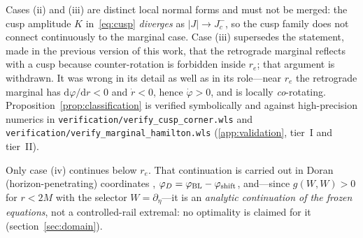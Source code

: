 \documentclass[12pt]{iopart}
\theoremstyle{plain}
\theoremstyle{definition}
\theoremstyle{remark}
\newcommand{\re}{r_{e}}
\newcommand{\Jc}{J_{c}}
\newcommand{\dd}{\mathrm{d}}
\begin{document}
Cases (ii) and (iii) are distinct local normal forms and must not be merged: the
cusp amplitude $K$ in~\eqref{eq:cusp} \emph{diverges} as $|J|\to\Jc^-$, so the
cusp family does not connect continuously to the marginal case. Case (iii)
supersedes the statement, made in the previous version of this work, that the
retrograde marginal reflects with a cusp because counter-rotation is forbidden
inside $\re$; that argument is withdrawn. It was wrong in its detail as well as
in its role---near $\re$ the retrograde marginal has $\dd\varphi/\dd r<0$ and
$\dot r<0$, hence $\dot\varphi>0$, and is locally \emph{co}-rotating.
Proposition~\ref{prop:classification} is verified symbolically and against
high-precision numerics in \texttt{verification/verify\_cusp\_corner.wls} and
\texttt{verification/verify\_marginal\_hamilton.wls}
(\ref{app:validation}, tier~I and tier~II).

Only case (iv) continues below $\re$. That continuation is carried out in Doran
(horizon-penetrating) coordinates
\cite{Doran2000,Natario2009,MartelPoisson2001},
$\varphi_D=\varphi_{\rm BL}-\varphi_{\rm shift}$, and---since $g(W,W)>0$ for
$r<2M$ with the selector $W=\partial_\eta$---it is an \emph{analytic
continuation of the frozen equations}, not a controlled-rail extremal: no
optimality is claimed for it (section~\ref{sec:domain}).
\end{document}
